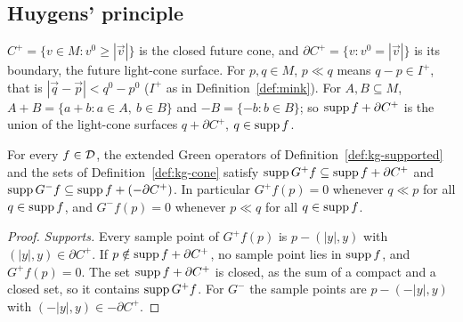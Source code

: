 \begin{extra}
\subsection{Huygens' principle}

\noindent{}

\begin{definition}\label{def:kg-cone}
$C^+=\{v\in M:v^0\ge|\vec v|\}$ is the closed future cone, and $\partial C^+=\{v:v^0=|\vec v|\}$ is
its boundary, the future light-cone surface. For $p,q\in M$, $p\ll q$ means $q-p\in I^+$, that is
$|\vec q-\vec p|<q^0-p^0$ ($I^+$ as in Definition~\ref{def:mink}). For $A,B\subseteq M$,
$A+B=\{a+b:a\in A,\ b\in B\}$ and $-B=\{-b:b\in B\}$; so $\operatorname{supp} f+\partial C^+$ is the union of the
light-cone surfaces $q+\partial C^+$, $q\in\operatorname{supp} f$. 
\end{definition}

\begin{proposition}\label{prop:kg-huygens}
For every $f\in\mathcal D$, the extended Green operators of Definition~\ref{def:kg-supported} and the sets of
Definition~\ref{def:kg-cone} satisfy $\operatorname{supp} G^+f\subseteq\operatorname{supp} f+\partial C^+$ and
$\operatorname{supp} G^-f\subseteq\operatorname{supp} f+(-\partial C^+)$. In particular $G^+f(p)=0$ whenever $q\ll p$ for all
$q\in\operatorname{supp} f$, and $G^-f(p)=0$ whenever $p\ll q$ for all $q\in\operatorname{supp} f$.
\end{proposition}
\begin{proof}
\emph{Supports.} Every sample point of $G^+f(p)$ is $p-(|y|,y)$ with $(|y|,y)\in\partial C^+$. If
$p\notin\operatorname{supp} f+\partial C^+$, no sample point lies in $\operatorname{supp} f$, and $G^+f(p)=0$. The set
$\operatorname{supp} f+\partial C^+$ is closed, as the sum of a compact and a closed set, so it contains
$\operatorname{supp} G^+f$. For $G^-$ the sample points are $p-(-|y|,y)$ with $(-|y|,y)\in-\partial C^+$.


\end{proof}
\end{extra}
